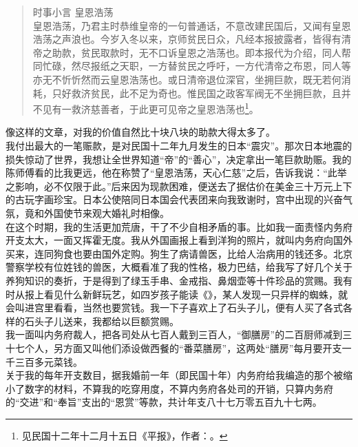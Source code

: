 \begin{quote}
	时事小言 皇恩浩荡\\

皇恩浩荡，乃君主时恭维皇帝的一句普通话，不意改建民国后，又闻有皇恩浩荡之声浪也。今岁入冬以来，京师贫民日众，凡经本报披露者，皆得有清帝之助款，贫民取款时，无不口诉皇恩之浩荡也。即本报代为介绍，同人帮同忙碌，然尽报纸之天职，一方替贫民之呼吁，一方代清帝之布恩，同人等亦无不忻忻然而云皇恩浩荡也。或日清帝退位深官，坐拥巨款，既无若何消耗，只好救济贫民，此不足为奇也。惟民国之政客军阀无不坐拥巨款，且并不见有一救济慈善者，于此更可见帝之皇恩浩荡也\footnote{见民国十二年十二月十五日《平报》，作者：。}。
\end{quote}

像这样的文章，对我的价值自然比十块八块的助款大得太多了。\\

我付出最大的一笔赈款，是对民国十二年九月发生的日本“震灾”。那次日本地震的损失惊动了世界，我想让全世界知道“帝”的“善心”，决定拿出一笔巨款助赈。我的陈师傅看的比我更远，他在称赞了“皇恩浩荡，天心仁慈”之后，告诉我说：“此举之影响，必不仅限于此。”后来因为现款困难，便送去了据估价在美金三十万元上下的古玩字画珍宝。日本公使陪同日本国会代表团来向我致谢时，宫中出现的兴奋气氛，竟和外国使节来观大婚礼时相像。\\

在这个时期，我的生活更加荒唐，干了不少自相矛盾的事。比如我一面责怪内务府开支太大，一面又挥霍无度。我从外国画报上看到洋狗的照片，就叫内务府向国外买来，连同狗食也要由国外定购。狗生了病请兽医，比给人治病用的钱还多。北京警察学校有位姓钱的兽医，大概看准了我的性格，极力巴结，给我写了好几个关于养狗知识的奏折，于是得到了绿玉手串、金戒指、鼻烟壶等十件珍品的赏赐。我有时从报上看见什么新鲜玩艺，如四岁孩子能读《》，某人发现一只异样的蜘蛛，就会叫进宫里看看，当然也要赏钱。我一下子喜欢上了石头子儿，便有人买了各式各样的石头子儿送来，我都给以巨额赏赐。\\

我一面叫内务府裁人，把各司处从七百人戴到三百人，“御膳房”的二百厨师减到三十七个人，另方面又叫他们添设做西餐的“番菜膳房”，这两处“膳房”每月要开支一千三百多元菜钱。\\

关于我的每年开支数目，据我婚前一年（即民国十年）内务府给我编造的那个被缩小了数字的材料，不算我的吃穿用度，不算内务府各处司的开销，只算内务府的“交进”和“奉旨”支出的“恩赏”等款，共计年支八十七万零五百九十七两。\\

